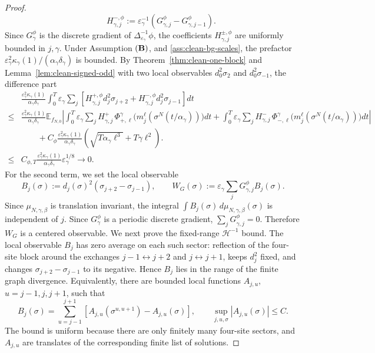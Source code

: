 \documentclass{article}
\begin{document}
\begin{proof}
\[\qquad
H_{\gamma,j}^{-,\phi}:=
\varepsilon_\gamma^{-1}(G_{\gamma,j}^{\phi}-G_{\gamma,j-1}^{\phi}).
\]
Since \(G_\gamma^\phi\) is the discrete gradient of \(\Delta_{\varepsilon_\gamma}^{-1}\phi\), the coefficients \(H_{\gamma,j}^{\pm,\phi}\) are uniformly bounded in \(j,\gamma\). 
Under Assumption \(({\bf B})\), and  \eqref{ass:clean-bg-scales}, the prefactor \(\varepsilon_\gamma^2\kappa_\gamma(1)/(\alpha_\gamma\delta_\gamma)\) is bounded.
By Theorem~\ref{thm:clean-one-block} and Lemma~\ref{lem:clean-signed-odd} with two local observables \(d_0^2\sigma_2\) and \(d_0^2\sigma_{-1}\), the difference part 
\begin{align}\label{eq:aIDE2}
  & \frac{\varepsilon_\gamma^2\kappa_\gamma(1)}{\alpha_\gamma\delta_\gamma}
\int_0^T
\varepsilon_\gamma\sum_j
\left[
H_{\gamma,j}^{+,\phi}d_j^2\sigma_{j+2}
+H_{\gamma,j}^{-,\phi}d_j^2\sigma_{j-1}
\right]dt \nonumber \\
\le &  \frac{\varepsilon_\gamma^2\kappa_\gamma(1)}{\alpha_\gamma\delta_\gamma}
\mathbb E_{f_{N,0}}\left|\int_0^T \varepsilon_\gamma\sum_j
H^+_{\gamma,j}\,\Phi_{+,\ell}^{\gamma}\bigl(m_j^\ell(\sigma^N(t/\alpha_\gamma))\bigr)dt
+ \int_0^T \varepsilon_\gamma\sum_j
H^-_{\gamma,j}\,\Phi_{-,\ell}^{\gamma}\bigl(m_j^\ell(\sigma^N(t/\alpha_\gamma))\bigr)dt \right| \nonumber\\
& \qquad + C_\phi  \frac{\varepsilon_\gamma^2\kappa_\gamma(1)}{\alpha_\gamma\delta_\gamma} \left( \sqrt{T\alpha_\gamma\ell^3} +T\gamma\ell^2 \right). \nonumber \\
\le & C_{\phi,T}\frac{\varepsilon_\gamma^2\kappa_\gamma(1)}{\alpha_\gamma\delta_\gamma}\varepsilon^{1/8}_{\gamma} \to 0.
\end{align}
For the second term, we set the local observable
\[
B_j(\sigma):=d_j(\sigma)^2(\sigma_{j+2}-\sigma_{j-1}),
\qquad
W_G(\sigma):=\varepsilon_\gamma\sum_jG_{\gamma,j}^{\phi}B_j(\sigma).
\]
Since \(\mu_{N,\gamma,\beta}\) is translation invariant, the integral $\int B_j(\sigma)\,d\mu_{N,\gamma,\beta}(\sigma)$ is independent of \(j\).  
Since \(G_{\gamma}^{\phi}\) is a periodic discrete
gradient, \(\sum_jG_{\gamma,j}^{\phi}=0\). Therefore \(W_G\) is a centered observable.
We next prove the fixed-range \(\mathcal H^{-1}\) bound.
The local observable \(B_j\) has zero average on each such sector: reflection of the four-site block around the exchanges \(j-1\leftrightarrow j+2\) and
\(j\leftrightarrow j+1\), keeps \(d_j^2\) fixed, and changes
\(\sigma_{j+2}-\sigma_{j-1}\) to its negative.  Hence \(B_j\) lies in the
range of the finite graph divergence.  Equivalently, there are bounded local functions \(A_{j,u}\), \(u=j-1,j,j+1\), such that
\[
B_j(\sigma)
=
\sum_{u=j-1}^{j+1}
\left[
A_{j,u}(\sigma^{u,u+1})-A_{j,u}(\sigma)
\right],
\qquad
\sup_{j,u,\sigma}|A_{j,u}(\sigma)|\le C .
\]
The bound is uniform because there are only finitely many four-site sectors, and \(A_{j,u}\) are translates of the corresponding finite list of solutions.


\end{proof}
\end{document}
